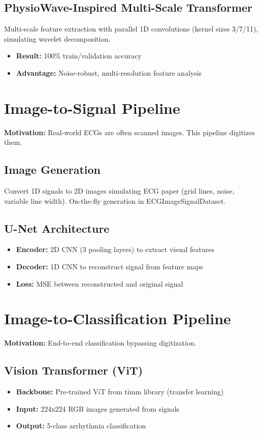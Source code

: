 \subsection{PhysioWave-Inspired Multi-Scale Transformer}
Multi-scale feature extraction with parallel 1D convolutions (kernel sizes 3/7/11), simulating wavelet decomposition.
\begin{itemize}
    \item \textbf{Result:} 100\% train/validation accuracy
    \item \textbf{Advantage:} Noise-robust, multi-resolution feature analysis
\end{itemize}

\section{Image-to-Signal Pipeline}
\textbf{Motivation:} Real-world ECGs are often scanned images. This pipeline digitizes them.

\subsection{Image Generation}
Convert 1D signals to 2D images simulating ECG paper (grid lines, noise, variable line width). On-the-fly generation in ECGImageSignalDataset.

\subsection{U-Net Architecture}
\begin{itemize}
    \item \textbf{Encoder:} 2D CNN (3 pooling layers) to extract visual features
    \item \textbf{Decoder:} 1D CNN to reconstruct signal from feature maps
    \item \textbf{Loss:} MSE between reconstructed and original signal
\end{itemize}

\section{Image-to-Classification Pipeline}
\textbf{Motivation:} End-to-end classification bypassing digitization.

\subsection{Vision Transformer (ViT)}
\begin{itemize}
    \item \textbf{Backbone:} Pre-trained ViT from timm library (transfer learning)
    \item \textbf{Input:} 224x224 RGB images generated from signals
    \item \textbf{Output:} 5-class arrhythmia classification
\end{itemize}

